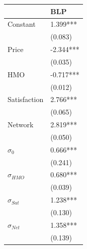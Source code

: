 \begin{tabular}{ll}
\hline
 & BLP \\
\hline
Constant & 1.399*** \\
 & (0.083) \\
Price & -2.344*** \\
 & (0.035) \\
HMO & -0.717*** \\
 & (0.012) \\
Satisfaction & 2.766*** \\
 & (0.065) \\
Network & 2.819*** \\
 & (0.050) \\
\hline
$\sigma_{0}$ & 0.666*** \\
 & (0.241) \\
$\sigma_{HMO}$ & 0.680*** \\
 & (0.039) \\
$\sigma_{Sat}$ & 1.238*** \\
 & (0.130) \\
$\sigma_{Net}$ & 1.358*** \\
 & (0.139) \\
\hline
\end{tabular}